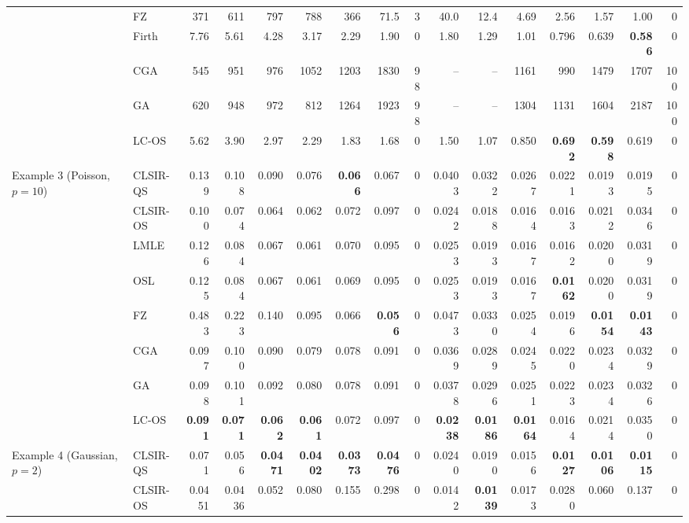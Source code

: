 \begin{tabular}{llrrrrrrrrrrrrrr}
 & FZ & 371 & 611 & 797 & 788 & 366 & 71.5 & 3 & 40.0 & 12.4 & 4.69 & 2.56 & 1.57 & 1.00 & 0\\
 & Firth & 7.76 & 5.61 & 4.28 & 3.17 & 2.29 & 1.90 & 0 & 1.80 & 1.29 & 1.01 & 0.796 & 0.639 & \textbf{0.586} & 0\\
 & CGA & 545 & 951 & 976 & 1052 & 1203 & 1830 & 98 & -- & -- & 1161 & 990 & 1479 & 1707 & 100\\
 & GA & 620 & 948 & 972 & 812 & 1264 & 1923 & 98 & -- & -- & 1304 & 1131 & 1604 & 2187 & 100\\
 & LC-OS & 5.62 & 3.90 & 2.97 & 2.29 & 1.83 & 1.68 & 0 & 1.50 & 1.07 & 0.850 & \textbf{0.692} & \textbf{0.598} & 0.619 & 0\\
\addlinespace
Example 3 (Poisson, $p=10$) & CLSIR-QS & 0.139 & 0.108 & 0.090 & 0.076 & \textbf{0.066} & 0.067 & 0 & 0.0403 & 0.0322 & 0.0267 & 0.0221 & 0.0193 & 0.0195 & 0\\
 & CLSIR-OS & 0.100 & 0.074 & 0.064 & 0.062 & 0.072 & 0.097 & 0 & 0.0242 & 0.0188 & 0.0164 & 0.0163 & 0.0212 & 0.0346 & 0\\
 & LMLE & 0.126 & 0.084 & 0.067 & 0.061 & 0.070 & 0.095 & 0 & 0.0253 & 0.0193 & 0.0167 & 0.0162 & 0.0200 & 0.0319 & 0\\
 & OSL & 0.125 & 0.084 & 0.067 & 0.061 & 0.069 & 0.095 & 0 & 0.0253 & 0.0193 & 0.0167 & \textbf{0.0162} & 0.0200 & 0.0319 & 0\\
 & FZ & 0.483 & 0.223 & 0.140 & 0.095 & 0.066 & \textbf{0.056} & 0 & 0.0473 & 0.0330 & 0.0254 & 0.0196 & \textbf{0.0154} & \textbf{0.0143} & 0\\
 & CGA & 0.097 & 0.100 & 0.090 & 0.079 & 0.078 & 0.091 & 0 & 0.0369 & 0.0289 & 0.0245 & 0.0220 & 0.0234 & 0.0329 & 0\\
 & GA & 0.098 & 0.101 & 0.092 & 0.080 & 0.078 & 0.091 & 0 & 0.0378 & 0.0296 & 0.0251 & 0.0223 & 0.0234 & 0.0326 & 0\\
 & LC-OS & \textbf{0.091} & \textbf{0.071} & \textbf{0.062} & \textbf{0.061} & 0.072 & 0.097 & 0 & \textbf{0.0238} & \textbf{0.0186} & \textbf{0.0164} & 0.0164 & 0.0214 & 0.0350 & 0\\
\addlinespace
Example 4 (Gaussian, $p=2$) & CLSIR-QS & 0.071 & 0.056 & \textbf{0.0471} & \textbf{0.0402} & \textbf{0.0373} & \textbf{0.0476} & 0 & 0.0240 & 0.0190 & 0.0156 & \textbf{0.0127} & \textbf{0.0106} & \textbf{0.0115} & 0\\
 & CLSIR-OS & 0.0451 & 0.0436 & 0.052 & 0.080 & 0.155 & 0.298 & 0 & 0.0142 & \textbf{0.0139} & 0.0173 & 0.0280 & 0.060 & 0.137 & 0\\

\end{tabular}
